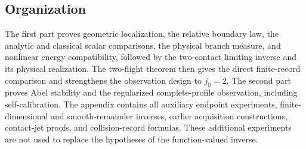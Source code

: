 \subsection{Organization}
The first part proves geometric localization, the relative boundary law,
the analytic and classical scalar comparisons, the physical branch
measure, and nonlinear
energy compatibility, followed by the two-contact limiting
inverse and its physical realization. The two-flight theorem then gives
the direct finite-record comparison and strengthens the observation
design to $j_0=2$. The second part proves Abel stability and the
regularized complete-profile observation, including self-calibration.
The appendix contains all auxiliary endpoint experiments,
finite-dimensional and smooth-remainder inverses, earlier acquisition
constructions, contact-jet proofs, and collision-record formulas.
These additional experiments are not used to replace the hypotheses
of the function-valued inverse.
